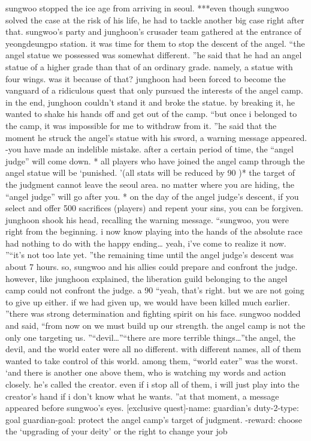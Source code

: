 sungwoo stopped the ice age from arriving in seoul.
***even though sungwoo solved the case at the risk of his life, he had to tackle another big case right after that.
 sungwoo’s party and junghoon’s crusader team gathered at the entrance of yeongdeungpo station.
 it was time for them to stop the descent of the angel.
“the angel statue we possessed was somewhat different.
”he said that he had an angel statue of a higher grade than that of an ordinary grade.
 namely, a statue with four wings.
was it because of that? junghoon had been forced to become the vanguard of a ridiculous quest that only pursued the interests of the angel camp.
in the end, junghoon couldn’t stand it and broke the statue.
 by breaking it, he wanted to shake his hands off and get out of the camp.
“but once i belonged to the camp, it was impossible for me to withdraw from it.
”he said that the moment he struck the angel’s statue with his sword, a warning message appeared.
-you have made an indelible mistake.
 after a certain period of time, the “angel judge” will come down.
* all players who have joined the angel camp through the angel statue will be ‘punished.
’(all stats will be reduced by 90%
)* the target of the judgment cannot leave the seoul area.
 no matter where you are hiding, the “angel judge” will go after you.
* on the day of the angel judge’s descent, if you select and offer 500 sacrifices (players) and repent your sins, you can be forgiven.
junghoon shook his head, recalling the warning message.
“sungwoo, you were right from the beginning.
 i now know playing into the hands of the absolute race had nothing to do with the happy ending… yeah, i’ve come to realize it now.
”“it’s not too late yet.
”the remaining time until the angel judge’s descent was about 7 hours.
 so, sungwoo and his allies could prepare and confront the judge.
however, like junghoon explained, the liberation guild belonging to the angel camp could not confront the judge.
 a 90%
“yeah, that’s right.
 but we are not going to give up either.
 if we had given up, we would have been killed much earlier.
”there was strong determination and fighting spirit on his face.
sungwoo nodded and said, “from now on we must build up our strength.
 the angel camp is not the only one targeting us.
”“devil…”“there are more terrible things…”the angel, the devil, and the world eater were all no different.
 with different names, all of them wanted to take control of this world.
 among them, “world eater” was the worst.
‘and there is another one above them, who is watching my words and action closely.
 he’s called the creator.
 even if i stop all of them, i will just play into the creator’s hand if i don’t know what he wants.
”at that moment, a message appeared before sungwoo’s eyes.
[exclusive quest]-name: guardian’s duty-2-type: goal guardian-goal: protect the angel camp’s target of judgment.
-reward: choose the ‘upgrading of your deity’ or the right to change your job

